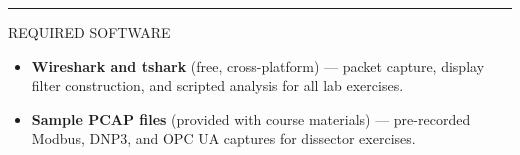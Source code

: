 \documentclass[10pt]{article}
\begin{document}
\smallskip
{\color{wnavy}\rule{\linewidth}{0.4pt}}
\smallskip
{\small\sffamily\color{wgray}\MakeUppercase{Required Software}}
\smallskip

\begin{itemize}\small
  \item \textbf{Wireshark and tshark} (free, cross-platform) — packet capture, display filter construction, and scripted analysis for all lab exercises.
  \item \textbf{Sample PCAP files} (provided with course materials) — pre-recorded Modbus, DNP3, and OPC UA captures for dissector exercises.
\end{itemize}


\vfill

\end{document}
